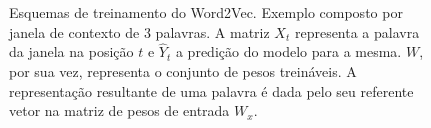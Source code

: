 \begin{figure}%
    \centering
    \qquad
    \caption{Esquemas de treinamento do Word2Vec. Exemplo composto por janela de
             contexto de 3 palavras. A matriz $X_t$ representa a palavra da
             janela na posição $t$ e $\hat{Y}_t$ a predição do modelo para a
             mesma. $W$, por sua vez, representa o conjunto de pesos treináveis.
             A representação resultante de uma palavra é dada pelo seu referente
             vetor na matriz de pesos de entrada $W_x$.}%
    \label{fig:w2v}%
\end{figure}

